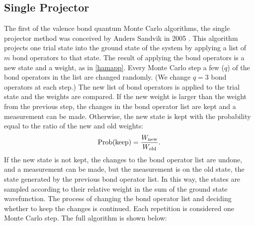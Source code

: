 \subsection{Single Projector}
\label{single}
The first of the valence bond quantum Monte Carlo algorithms, the single projector method was conceived by Anders Sandvik in 2005 \cite{Sandvik_vbqmc}. 
This algorithm projects one trial state into the ground state of the system by applying a list of $m$ bond operators to that state.
The result of applying the bond operators is a new state and a weight, as in \eqref{hamapp}.
Every Monte Carlo step a few ($q$) of the bond operators in the list are changed randomly.  (We change $q=3$ bond operators at each step.)
The new list of bond operators is applied to the trial state and the weights are compared. 
If the new weight is larger than the weight from the previous step, the changes in the bond operator list are kept and a measurement can be made.  
Otherwise, the new state is kept with the probability equal to the ratio of the new and old weights:
\begin{equation}
{\rm Prob(keep)} = \frac{W_{\rm new}}{W_{\rm old}}.
\end{equation}
If the new state is not kept, the changes to the bond operator list are undone, and a measurement can be made, but the measurement is on the old state, the state generated by the previous bond operator list.
In this way, the states are sampled according to their relative weight in the sum of the ground state wavefunction.
The process of changing the bond operator list and deciding whether to keep the changes is continued.  Each repetition is considered one Monte Carlo step.  
The full algorithm is shown below:
